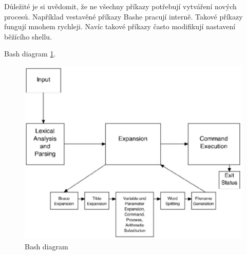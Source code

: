 \documentclass[thesis=M,czech]{FITthesis}[2012/06/26]
\begin{document}
Důležité je si uvědomit, že ne všechny příkazy potřebují vytváření nových procesů. Například vestavěné příkazy Bashe pracují interně. Takové příkazy fungují mnohem rychleji. Navíc takové příkazy často modifikují nastavení běžícího shellu.









Bash diagram \ref{fig:bash_diag}.

\begin{figure}[htb]\centering
	\includegraphics[width=\textwidth]{./images/bash-article-diagram}
	\caption{Bash diagram}
	\label{fig:bash_diag}
\end{figure}


\end{document}
